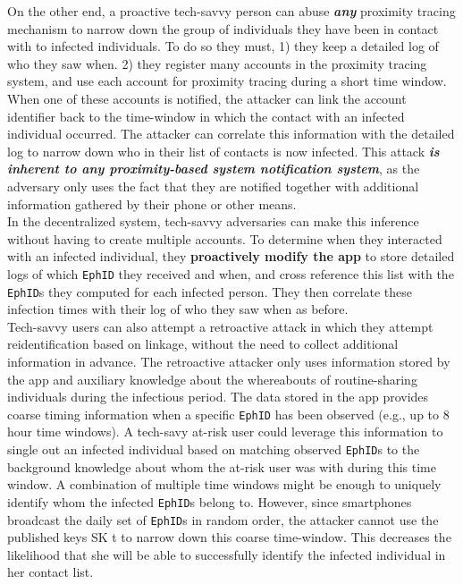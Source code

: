 \documentclass[12pt,a4paper]{article}
\begin{document}
On the other end, a proactive tech-savvy person can abuse \textbf{\textit{any}} proximity tracing mechanism to narrow down the group of individuals they have been in contact with to infected individuals. To do so they must, 1) they keep a detailed log of who they saw when. 2) they register many accounts in the proximity tracing system, and use each account for proximity tracing during a short time window. When one of these accounts is notified, the attacker can link the account identifier back to the time-window in which the contact with an infected individual occurred. The attacker can correlate this information with the detailed log to narrow down who in their list of contacts is now infected. This attack \textbf{\textit{is inherent to any proximity-based system notification system}}, as the adversary only uses the fact that they are notified together with additional information gathered by their phone or other means.\\[0.3cm] 
In the decentralized system, tech-savvy adversaries can make this inference without having
to create multiple accounts. To determine when they interacted with an infected individual, they \textbf{proactively modify the app} to store detailed logs of which \texttt{EphID} they received and when, and cross reference this list with the \texttt{EphID}s they computed for each infected person. They then correlate these infection times with their log of who they saw when as before.\\[0.3cm]
Tech-savvy users can also attempt a retroactive attack in which they attempt reidentification based on linkage, without the need to collect additional information in advance. The retroactive attacker only uses information stored by the app and auxiliary knowledge about the whereabouts of routine-sharing individuals during the infectious period. The data stored in the app provides coarse timing information when a specific \texttt{EphID} has been observed (e.g., up to 8 hour time windows). A tech-savy at-risk user could leverage this information to single out an infected individual based on matching observed \texttt{EphID}s to the background knowledge about whom the at-risk user was with during this time window. A combination of multiple time windows might be enough to uniquely identify whom the infected \texttt{EphID}s belong to. However, since smartphones broadcast the daily set of \texttt{EphID}s in random order, the attacker cannot use the published keys SK t to narrow down this coarse time-window. This decreases the likelihood that she will be able to successfully identify the infected individual in her contact list.\\[0.3cm]
\end{document}
